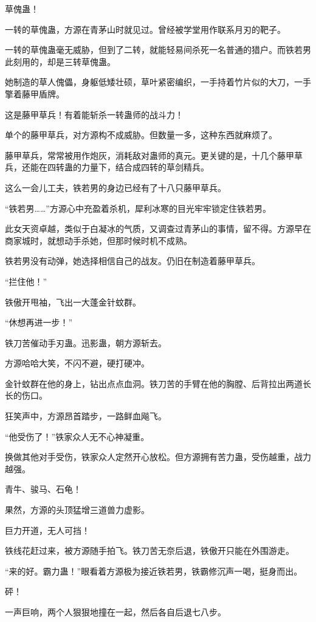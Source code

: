 \begin{this_body}
草傀蛊！

一转的草傀蛊，方源在青茅山时就见过。曾经被学堂用作联系月刃的靶子。

一转的草傀蛊毫无威胁，但到了二转，就能轻易间杀死一名普通的猎户。而铁若男此刻用的，却是三转草傀蛊。

她制造的草人傀儡，身躯低矮壮硕，草叶紧密编织，一手持着竹片似的大刀，一手擎着藤甲盾牌。

这是藤甲草兵！有着能斩杀一转蛊师的战斗力！

单个的藤甲草兵，对方源构不成威胁。但数量一多，这种东西就麻烦了。

藤甲草兵，常常被用作炮灰，消耗敌对蛊师的真元。更关键的是，十几个藤甲草兵，还能在四转蛊的力量下，结合成四转的草剑精兵。

这么一会儿工夫，铁若男的身边已经有了十八只藤甲草兵。

“铁若男……”方源心中充盈着杀机，犀利冰寒的目光牢牢锁定住铁若男。

此女天资卓越，类似于白凝冰的气质，又调查过青茅山的事情，留不得。方源早在商家城时，就想动手杀她，但那时候时机不成熟。

铁若男没有动弹，她选择相信自己的战友。仍旧在制造着藤甲草兵。

“拦住他！”

铁傲开甩袖，飞出一大蓬金针蚊群。

“休想再进一步！”

铁刀苦催动手刃蛊。迅影蛊，朝方源斩去。

方源哈哈大笑，不闪不避，硬打硬冲。

金针蚊群在他的身上，钻出点点血洞。铁刀苦的手臂在他的胸膛、后背拉出两道长长的伤口。

狂笑声中，方源昂首踏步，一路鲜血飚飞。

“他受伤了！”铁家众人无不心神凝重。

换做其他对手受伤，铁家众人定然开心放松。但方源拥有苦力蛊，受伤越重，战力越强。

青牛、骏马、石龟！

果然，方源的头顶猛增三道兽力虚影。

巨力开道，无人可挡！

铁线花赶过来，被方源随手拍飞。铁刀苦无奈后退，铁傲开只能在外围游走。

“来的好。霸力蛊！”眼看着方源极为接近铁若男，铁霸修沉声一喝，挺身而出。

砰！

一声巨响，两个人狠狠地撞在一起，然后各自后退七八步。


\end{this_body}
